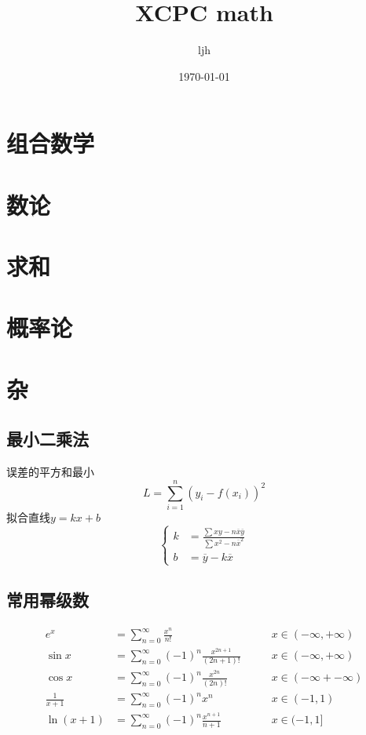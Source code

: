 \documentclass[12pt, a4paper, oneside]{ctexbook}
\title{{\Huge{\textbf{XCPC math}}}}
\author{ljh}
\date{\today}
\begin{document}
\maketitle

\setcounter{page}{1}

\newpage
{}
\setcounter{page}{1}
\tableofcontents
\newpage
\setcounter{page}{1}

\chapter{组合数学}


\chapter{数论}


\chapter{求和}




\chapter{概率论}



\chapter{杂}
\section{最小二乘法}
误差的平方和最小\\
$$
  L=\sum_{i=1}^{n} (y_i-f(x_i))^2
$$
拟合直线$y=kx+b$ 
$$
  \begin{cases}
    k&=\frac{\sum xy- n \overline{x}\overline{y}}{\sum x^2-n\overline{x}^2}\\
    b&=\overline{y}-k\overline{x}
  \end{cases}
$$

\section{常用幂级数}
$$
\begin{aligned}
e^x&=\sum_{n=0}^{\infty}\frac{x^n}{n!} \qquad& x\in(-\infty,+\infty)\\
\sin x&=\sum_{n=0}^{\infty}(-1)^n\frac{x^{2n+1}}{(2n+1)!} \qquad& x\in(-\infty,+\infty)\\
\cos x&=\sum_{n=0}^{\infty}(-1)^n\frac{x^{2n}}{(2n)!} \qquad& x\in(-\infty+-\infty)\\
\frac{1}{x+1}&=\sum_{n=0}^{\infty}(-1)^nx^n \qquad& x\in(-1,1)\\
\ln{(x+1)}&=\sum_{n=0}^{\infty}(-1)^n\frac{x^{n+1}}{n+1}\qquad&x\in(-1,1]
\end{aligned}
$$
\end{document}
